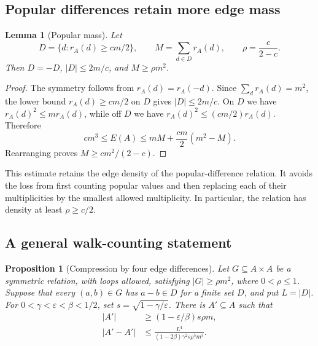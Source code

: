 \documentclass[11pt,letterpaper]{article}
\numberwithin{equation}{section}
\newtheorem{lemma}[theorem]{Lemma}
\newtheorem{proposition}[theorem]{Proposition}
\theoremstyle{definition}
\theoremstyle{remark}
\newcommand{\1}{\mathbf 1}
\newcommand{\abs}[1]{\left|#1\right|}
\begin{document}
\subsection{Popular differences retain more edge mass}

\begin{lemma}[Popular mass]\label{gsr:en:03:drc:popular-mass}
Let
\[
 D=\{d:r_A(d)\geq cm/2\},\qquad
 M=\sum_{d\in D}r_A(d),\qquad \rho=\frac{c}{2-c}.
\]
Then $D=-D$, $\abs D\leq2m/c$, and $M\geq\rho m^2$.
\end{lemma}

\begin{proof}
The symmetry follows from $r_A(d)=r_A(-d)$.  Since
$\sum_d r_A(d)=m^2$, the lower bound $r_A(d)\geq cm/2$ on $D$ gives
$\abs D\leq2m/c$.  On $D$ we have $r_A(d)^2\leq m r_A(d)$, while off
$D$ we have $r_A(d)^2\leq(cm/2)r_A(d)$.  Therefore
\[
 cm^3\leq E(A)\leq mM+\frac{cm}{2}(m^2-M).
\]
Rearranging proves $M\geq cm^2/(2-c)$.
\end{proof}

This estimate retains the edge density of the popular-difference
relation.  It avoids the loss from first counting popular values and
then replacing each of their multiplicities by the smallest allowed
multiplicity.  In particular, the relation has density at least
$\rho\geq c/2$.

\subsection{A general walk-counting statement}

\begin{proposition}[Compression by four edge differences]
\label{gsr:en:03:drc:graph-compression}
Let $G\subseteq A\times A$ be a symmetric relation, with loops allowed,
satisfying $\abs G\geq\rho m^2$, where $0<\rho\leq1$.  Suppose that
every $(a,b)\in G$ has $a-b\in D$ for a finite set $D$, and put $L=\abs D$.
For $0<\gamma<\varepsilon<\beta<1/2$, set
$s=\sqrt{1-\gamma/\varepsilon}$.  There is $A'\subseteq A$ such that
\begin{align}
 \abs{A'}&\geq(1-\varepsilon/\beta)s\rho m,
 \label{gsr:en:03:drc:graph-size}\\
 \abs{A'-A'}&\leq
 \frac{L^4}{(1-2\beta)\gamma^2s\rho^5m^3}.
 \label{gsr:en:03:drc:graph-difference}
\end{align}
\end{proposition}
\end{document}
